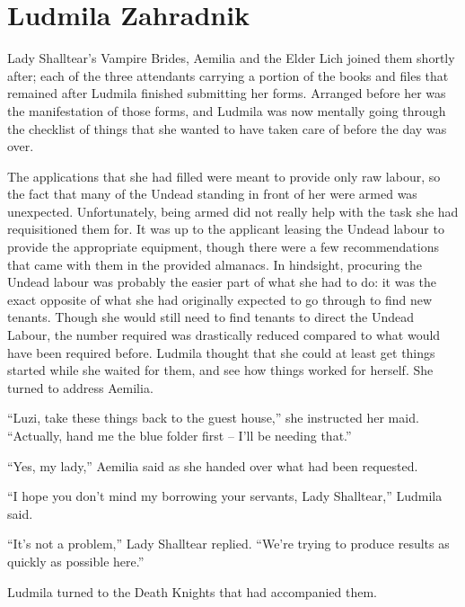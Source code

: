 \chapter{Ludmila Zahradnik}

Lady Shalltear’s Vampire Brides, Aemilia and the Elder Lich joined them shortly after; each of the three attendants carrying a portion of the books and files that remained after Ludmila finished submitting her forms. Arranged before her was the manifestation of those forms, and Ludmila was now mentally going through the checklist of things that she wanted to have taken care of before the day was over.

 

The applications that she had filled were meant to provide only raw labour, so the fact that many of the Undead standing in front of her were armed was unexpected. Unfortunately, being armed did not really help with the task she had requisitioned them for. It was up to the applicant leasing the Undead labour to provide the appropriate equipment, though there were a few recommendations that came with them in the provided almanacs. In hindsight, procuring the Undead labour was probably the easier part of what she had to do: it was the exact opposite of what she had originally expected to go through to find new tenants. Though she would still need to find tenants to direct the Undead Labour, the number required was drastically reduced compared to what would have been required before. Ludmila thought that she could at least get things started while she waited for them, and see how things worked for herself. She turned to address Aemilia.

 

“Luzi, take these things back to the guest house,” she instructed her maid. “Actually, hand me the blue folder first – I’ll be needing that.”

 

“Yes, my lady,” Aemilia said as she handed over what had been requested.

 

“I hope you don’t mind my borrowing your servants, Lady Shalltear,” Ludmila said.

 

“It’s not a problem,” Lady Shalltear replied. “We’re trying to produce results as quickly as possible here.”

 

Ludmila turned to the Death Knights that had accompanied them.

 

